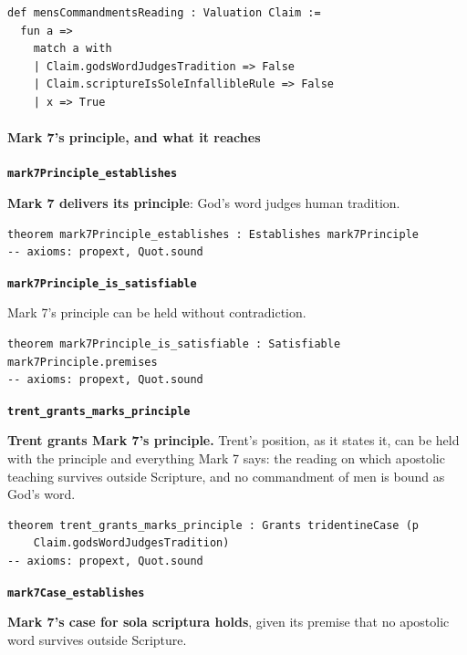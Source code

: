 \documentclass[11pt]{article}
\begin{document}
{\small\begin{verbatim}
def mensCommandmentsReading : Valuation Claim :=
  fun a =>
    match a with
    | Claim.godsWordJudgesTradition => False
    | Claim.scriptureIsSoleInfallibleRule => False
    | x => True
\end{verbatim}}
\paragraph*{Mark 7's principle, and what it reaches}
\leavevmode\par
\par\medskip\noindent\textbf{\texttt{mark7\allowbreak{}Principle\_\allowbreak{}establishes}}\par\nobreak\noindent
\textbf{Mark 7 delivers its principle}: God's word judges human tradition.

{\small\begin{verbatim}
theorem mark7Principle_establishes : Establishes mark7Principle
-- axioms: propext, Quot.sound
\end{verbatim}}
\par\medskip\noindent\textbf{\texttt{mark7\allowbreak{}Principle\_\allowbreak{}is\_\allowbreak{}satisfiable}}\par\nobreak\noindent
Mark 7's principle can be held without contradiction.

{\small\begin{verbatim}
theorem mark7Principle_is_satisfiable : Satisfiable mark7Principle.premises
-- axioms: propext, Quot.sound
\end{verbatim}}
\par\medskip\noindent\textbf{\texttt{trent\_\allowbreak{}grants\_\allowbreak{}marks\_\allowbreak{}principle}}\par\nobreak\noindent
\textbf{Trent grants Mark 7's principle.} Trent's position, as it states it, can be held with the principle and everything Mark 7 says: the reading on which apostolic teaching survives outside Scripture, and no commandment of men is bound as God's word.

{\small\begin{verbatim}
theorem trent_grants_marks_principle : Grants tridentineCase (p
    Claim.godsWordJudgesTradition)
-- axioms: propext, Quot.sound
\end{verbatim}}
\par\medskip\noindent\textbf{\texttt{mark7\allowbreak{}Case\_\allowbreak{}establishes}}\par\nobreak\noindent
\textbf{Mark 7's case for sola scriptura holds}, given its premise that no apostolic word survives outside Scripture.
\end{document}
